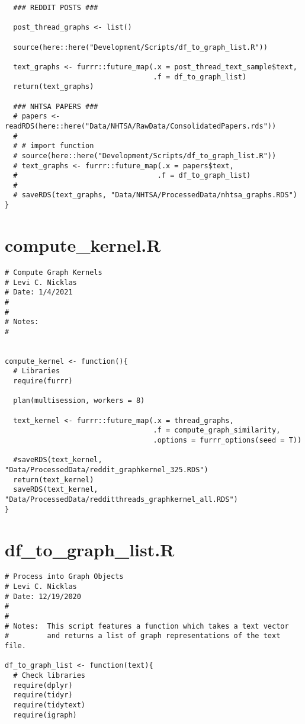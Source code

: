 \begin{appendices}
\begin{lstlisting}
  ### REDDIT POSTS ###
  
  post_thread_graphs <- list()

  source(here::here("Development/Scripts/df_to_graph_list.R"))
  
  text_graphs <- furrr::future_map(.x = post_thread_text_sample$text,
                                   .f = df_to_graph_list)
  return(text_graphs)
  
  ### NHTSA PAPERS ###
  # papers <- readRDS(here::here("Data/NHTSA/RawData/ConsolidatedPapers.rds"))
  # 
  # # import function
  # source(here::here("Development/Scripts/df_to_graph_list.R"))
  # text_graphs <- furrr::future_map(.x = papers$text,
  #                                 .f = df_to_graph_list)
  # 
  # saveRDS(text_graphs, "Data/NHTSA/ProcessedData/nhtsa_graphs.RDS")
}
\end{lstlisting}

\section{compute\_kernel.R}
\begin{lstlisting}
# Compute Graph Kernels
# Levi C. Nicklas
# Date: 1/4/2021
#
#
# Notes:  
#


compute_kernel <- function(){
  # Libraries
  require(furrr)
  
  plan(multisession, workers = 8)
  
  text_kernel <- furrr::future_map(.x = thread_graphs,
                                   .f = compute_graph_similarity,
                                   .options = furrr_options(seed = T))
  
  #saveRDS(text_kernel, "Data/ProcessedData/reddit_graphkernel_325.RDS")
  return(text_kernel)
  saveRDS(text_kernel, "Data/ProcessedData/redditthreads_graphkernel_all.RDS")
}
\end{lstlisting}

\section{df\_to\_graph\_list.R}
\begin{lstlisting}
# Process into Graph Objects
# Levi C. Nicklas
# Date: 12/19/2020
#
#
# Notes:  This script features a function which takes a text vector
#         and returns a list of graph representations of the text file.

df_to_graph_list <- function(text){
  # Check libraries
  require(dplyr)
  require(tidyr)
  require(tidytext)
  require(igraph)
  

\end{lstlisting}
\end{appendices}
